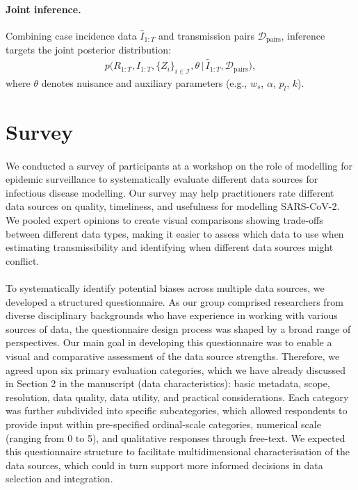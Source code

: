 \documentclass{article}
\begin{document}
\paragraph{Joint inference.}
Combining case incidence data $\widehat{I}_{1:T}$ and transmission pairs $\mathcal{D}_{\mathrm{pairs}}$, inference targets the joint posterior distribution:
\begin{align}
p\big(R_{1:T}, I_{1:T}, \{Z_i\}_{i\in\mathcal{I}}, \theta \,\big|\, \widehat{I}_{1:T}, \mathcal{D}_{\mathrm{pairs}}\big),
\end{align}
where $\theta$ denotes nuisance and auxiliary parameters (e.g., $w_s$, $\alpha$, $p_l$, $k$).  


\newpage

\section{Survey}
\paragraph{}We conducted a survey of participants at a workshop on the role of modelling for epidemic surveillance to systematically evaluate different data sources for infectious disease modelling.
Our survey may help practitioners rate different data sources on quality, timeliness, and usefulness for modelling SARS-CoV-2. We pooled expert opinions to create visual comparisons showing trade-offs between different data types, making it easier to assess which data to use when estimating transmissibility and identifying when different data sources might conflict.

\paragraph{}To systematically identify potential biases across multiple data sources, we developed a structured questionnaire. As our group comprised researchers from diverse disciplinary backgrounds who have experience in working with various sources of data, the questionnaire design process was shaped by a broad range of perspectives. Our main goal in developing this questionnaire was to enable a visual and comparative assessment of the data source strengths. Therefore, we agreed upon six primary evaluation categories, which we have already discussed in Section 2 in the manuscript (data characteristics): basic metadata, scope, resolution, data quality, data utility, and practical considerations. Each category was further subdivided into specific subcategories, which allowed respondents to provide input within pre-specified ordinal-scale categories, numerical scale (ranging from 0 to 5), and qualitative responses through free-text. We expected this questionnaire structure to facilitate multidimensional characterisation of the data sources, which could in turn support more informed decisions in data selection and integration. 
\end{document}
